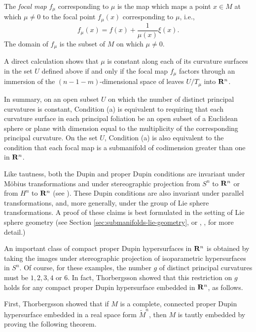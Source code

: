 \documentclass[12pt]{article}
\begin{document}
{The {\em focal map} $f_{\mu}$ corresponding to $\mu$ is the map
which maps a point $x\in M$ at which $\mu \neq 0$ to the focal point $f_{\mu}(x)$ corresponding to
$\mu$, i.e.,
\begin{equation}
\label{eq:focal-map-Euclidean}
f_{\mu}(x) = f(x) + \frac{1}{\mu(x)} \xi(x).
\end{equation}
The domain of $f_\mu$ is the subset of $M$ on which $\mu \neq 0$.

A direct calculation shows that $\mu$ is constant
along each of its curvature surfaces in the set $U$ defined above  if and only if
the focal map $f_{\mu}$ factors through an immersion of the
$(n-1-m)$-dimensional space of leaves $U/T_{\mu}$ into ${\bf R}^n$.

In summary, on an open subset $U$ on which the number of distinct
principal curvatures is constant, Condition (a) is equivalent
to requiring that each curvature surface in each principal
foliation be an open subset of a Euclidean sphere or plane
with dimension equal to the multiplicity of the corresponding
principal curvature. On the set $U$, Condition (a) is also equivalent
to the condition that each focal map is a submanifold of
codimension greater than one in ${\bf R}^n$.

Like tautness, both the Dupin and proper Dupin conditions are
invariant under M\"{o}bius transformations and under stereographic
projection from $S^n$ to ${\bf R}^n$ or from $H^n$ to ${\bf R}^n$
(see \cite[pp. 17--18]{Cec9}).  These Dupin conditions are
also invariant under parallel transformations,  and,  more generally, under
the group of Lie sphere transformations.  
A proof of these
claims is best formulated in the setting of Lie sphere geometry
(see Section \ref{sec:submanifolds-lie-geometry},  or \cite{P2}, \cite{Cec9},  for more detail.)

An important class of compact proper Dupin hypersurfaces in
${\bf R}^n$ is obtained by taking the images under stereographic
projection of isoparametric hypersurfaces in $S^n$.  Of course,
for these examples, the number $g$ of distinct principal curvatures
must be $1,2,3,4$ or 6.  In fact, Thorbergsson \cite{Th1} 
showed that this restriction on $g$ holds for any compact
proper Dupin hypersurface embedded in ${\bf R}^n$, as follows.


First, Thorbergsson \cite{Th1} showed that if $M$ is a complete, connected proper
Dupin hypersurface embedded in a real space form $\widetilde{M}^n$, then $M$ is tautly
embedded by proving the following theorem.


}
\end{document}
